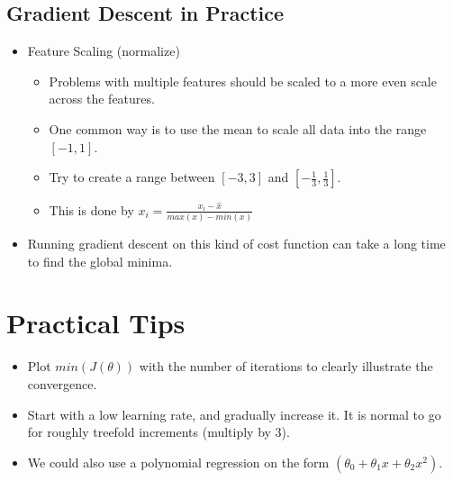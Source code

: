 \subsection{Gradient Descent in Practice}
\begin{itemize}
    \item Feature Scaling (normalize)
    \begin{itemize}
        \item Problems with multiple features should be scaled to a more even scale across the features.
        \item One common way is to use the mean to scale all data into the range $\left[-1, 1\right]$.
        \item Try to create a range between $\left[-3, 3\right]$ and $\left[-\frac{1}{3}, \frac{1}{3}\right]$.
        \item This is done by $x_i = \frac{x_i-\hat{x}}{max(x)-min(x)}$
    \end{itemize}
    \item Running gradient descent on this kind of cost function can take a long time to find the global minima.
\end{itemize}

\section{Practical Tips}
\begin{itemize}
    \item Plot $min(J(\theta))$ with the number of iterations to clearly illustrate the convergence.
    \item Start with a low learning rate, and gradually increase it. It is normal to go for roughly treefold increments (multiply by 3).
    \item We could also use a polynomial regression on the form $(\theta_0 + \theta_1x + \theta_2x^2)$.
\end{itemize}
